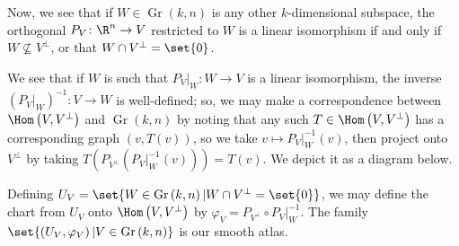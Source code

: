 \documentclass[10pt]{mypackage}
\renewcommand*{\mathbb}[1]{\varmathbb{#1}}
\begin{document}
\begin{enumerate}[(i)]
    Now, we see that if $W\in \operatorname{Gr}\left( k,n \right)$ is any other $k$-dimensional subspace, the orthogonal $P_{V}\colon \R^{n}\rightarrow V$ restricted to $W$ is a linear isomorphism if and only if $W\nsubseteq V^{\perp}$, or that $W\cap V^{\perp} = \set{0}$.\newline

    We see that if $W$ is such that $P_{V}|_{W}\colon W\rightarrow V$ is a linear isomorphism, the inverse $\left( P_{V}|_{W} \right)^{-1}\colon V\rightarrow W$ is well-defined; so, we may make a correspondence between $\Hom\left( V,V^{\perp} \right)$ and $\operatorname{Gr}\left( k,n \right)$ by noting that any such $T\in \Hom\left( V,V^{\perp} \right)$ has a corresponding graph $\left( v,T(v) \right)$, so we take $v\mapsto P_{V}|_{W}^{-1}\left( v \right)$, then project onto $V^{\perp}$ by taking $T\left( P_{V^{\perp}}\left( P_{V}|_{W}^{-1}(v) \right) \right) = T(v)$. We depict it as a diagram below.
    \begin{center}
    \end{center}
    Defining $U_{V} = \set{W\in \operatorname{Gr}\left( k,n \right) | W\cap V^{\perp} = \set{0}}$, we may define the chart from $U_{V}$ onto $\Hom\left( V,V^{\perp} \right)$ by $\varphi_{V} = P_{V^{\perp}}\circ P_{V}|_{W}^{-1}$. The family $\set{\left( U_V,\varphi_V \right) | V\in \operatorname{Gr}\left( k,n \right)}$ is our smooth atlas.
\end{enumerate}
\end{document}
